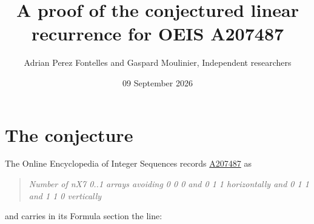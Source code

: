 \documentclass[11pt]{article}
\title{A proof of the conjectured linear recurrence for OEIS A207487}
\author{Adrian Perez Fontelles and Gaspard Moulinier, Independent researchers}
\date{09 September 2026}
\theoremstyle{definition}
\begin{document}
\maketitle
\section{The conjecture}

The Online Encyclopedia of Integer Sequences records \href{https://oeis.org/A207487}{A207487} as

\begin{quote}\itshape Number of nX7 0..1 arrays avoiding 0 0 0 and 0 1 1 horizontally and 0 1 1 and 1 1 0 vertically\end{quote}

and carries in its Formula section the line:
\end{document}
